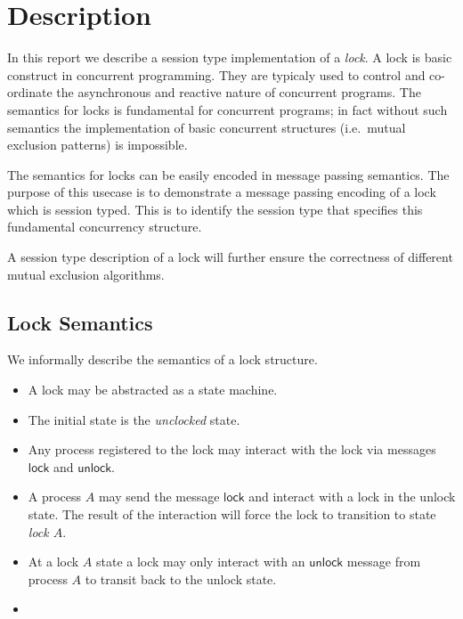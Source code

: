 \section{Description}

In this report we describe a session type implementation
of a {\em lock}. A lock is basic construct in concurrent
programming.
They are typicaly used 
to control and co-ordinate the asynchronous and reactive
nature of concurrent programs.
The semantics for locks is fundamental for concurrent
programs; in fact without such semantics the implementation
of basic concurrent structures (i.e.~mutual exclusion patterns)
is impossible.

The semantics for locks can be easily encoded in
message passing semantics. The purpose of this
usecase is to demonstrate a message passing encoding
of a lock which is session typed. This is to
identify the session type that specifies this
fundamental concurrency structure.

A session type description of a lock will further
ensure the correctness of different mutual exclusion algorithms.

\newcommand{\lock}{\ensuremath{\mathsf{lock}}\xspace}
\newcommand{\unlock}{\ensuremath{\mathsf{unlock}}\xspace}

\subsection{Lock Semantics}

We informally describe the semantics of a lock structure.

\begin{itemize}
	\item	A lock may be abstracted as a state machine.

	\item	The initial state is the {\em unclocked} state.

	\item	Any process registered to the lock may interact with the
			lock via messages \lock and \unlock.

	\item	A process $A$ may send the message \lock and interact with a lock in the unlock state.
			The result of the interaction will force the lock to transition to state {\em lock $A$}.

	\item	At a lock $A$ state a lock may only interact with an \unlock message from process $A$
			to transit back to the unlock state.

	\item	
\end{itemize}

